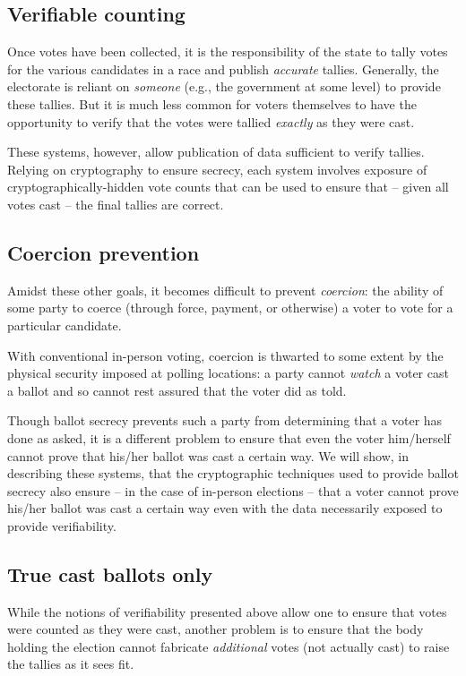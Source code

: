 \documentclass[10pt]{article}
\newcommand{\term}[1]{\textit{#1}}
\begin{document}
\begin{multicols}{2}
\subsection{Verifiable counting}

Once votes have been collected, it is the responsibility of the state to tally votes for the various
candidates in a race and publish \emph{accurate} tallies. Generally, the electorate is reliant on
\emph{someone} (e.g., the government at some level) to provide these tallies. But it is much less
common for voters themselves to have the opportunity to verify that the votes were tallied
\emph{exactly} as they were cast.

These systems, however, allow publication of data sufficient to verify tallies. Relying on
cryptography to ensure secrecy, each system involves exposure of cryptographically-hidden vote
counts that can be used to ensure that -- given all votes cast -- the final tallies are correct.

\subsection{Coercion prevention}

Amidst these other goals, it becomes difficult to prevent \term{coercion}: the ability of some party
to coerce (through force, payment, or otherwise) a voter to vote for a particular candidate.

With conventional in-person voting, coercion is thwarted to some extent by the physical security
imposed at polling locations: a party cannot \emph{watch} a voter cast a ballot and so cannot rest
assured that the voter did as told.

Though ballot secrecy prevents such a party from determining that a voter has done as asked, it is a
different problem to ensure that even the voter him/herself cannot prove that his/her ballot was
cast a certain way. We will show, in describing these systems, that the cryptographic techniques
used to provide ballot secrecy also ensure -- in the case of in-person elections -- that a voter
cannot prove his/her ballot was cast a certain way even with the data necessarily exposed to provide
verifiability.

\subsection{True cast ballots only}

While the notions of verifiability presented above allow one to ensure that votes were counted as
they were cast, another problem is to ensure that the body holding the election cannot fabricate
\emph{additional} votes (not actually cast) to raise the tallies as it sees fit.


\end{multicols}
\end{document}
